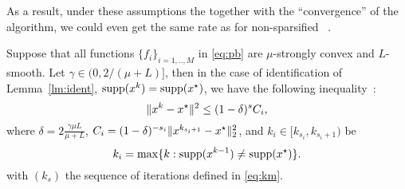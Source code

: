 As a result, under these assumptions the together with the ``convergence'' of the algorithm, we could even get the same rate as for non-sparsified \dave~\cite{ICML18}.

\begin{theorem}\label{th:rate_after}
Suppose that all functions $\{f_i\}_{i=1,..,M}$ in \eqref{eq:pb} are $\mu$-strongly convex and $L$-smooth. Let $\gamma \in (0,2/(\mu+L)]$, then in the case of identification of Lemma~\ref{lm:ident}, $\mathrm{supp}(x^k) = \mathrm{supp}(x^\star)$, we have the following inequality~:
\begin{equation}\label{eq:dif_prob4}
   \|x^k - x^\star\|^2 
 \leq  (1-\delta)^s C_i,
\end{equation}
where $\delta = 2\frac{\gamma \mu L}{\mu+L}$, $C_i = (1-\delta)^{-s_i}\|x^{k_{s_i+1}} - x^\star\|_2^2$, and $k_i\in[k_{s_i}, k_{s_i+1})$ be 
\[
k_i = \max\{k:\mathrm{supp}(x^{k-1})\neq\mathrm{supp}(x^\star)\}.
\]
with $(k_s)$ the sequence of iterations defined in \eqref{eq:km}.
\end{theorem}
